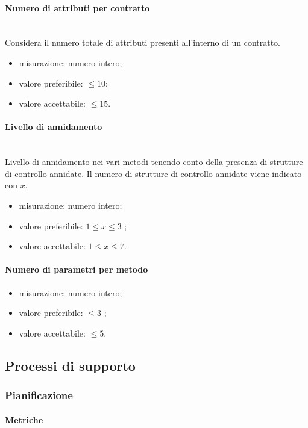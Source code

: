 			\paragraph*{Numero di attributi per contratto}
			\mbox{}\\
			Considera il numero totale di attributi presenti
			all'interno di un contratto.
			\begin{itemize}
				\item misurazione: numero intero;
				\item valore preferibile: $\leq 10$;
				\item valore accettabile: $\leq 15$.
			\end{itemize}
		
			\paragraph*{Livello di annidamento}
			\mbox{}\\
			Livello di annidamento nei vari metodi tenendo conto della
			presenza di strutture di controllo annidate. Il numero di strutture di controllo annidate viene indicato con $x$.
			\begin{itemize}
				\item misurazione: numero intero;
				\item valore preferibile: $ 1 \leq x \leq3$ ;
				\item valore accettabile: $1 \leq x\leq 7$.
			\end{itemize}
	
		
			\paragraph*{Numero di parametri per metodo}
			\begin{itemize}
				\item misurazione: numero intero;
				\item valore preferibile: $ \leq 3$ ;
				\item valore accettabile: $ \leq 5$.
			\end{itemize}
			
\subsection{Processi di supporto}
	\subsubsection{Pianificazione}
		\paragraph{Metriche}			
